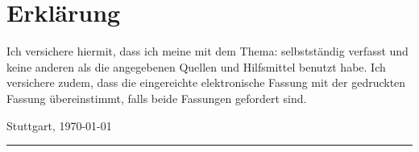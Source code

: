
\thispagestyle{empty}

\section*{Erklärung}
\vspace*{2em}

Ich versichere hiermit, dass ich meine {\art} mit dem Thema: {\itshape \titel } selbstständig verfasst und keine anderen als die angegebenen Quellen und Hilfsmittel benutzt habe. Ich versichere zudem, dass die eingereichte elektronische Fassung mit der gedruckten Fassung übereinstimmt, falls beide Fassungen gefordert sind. 

\vspace{3em}

Stuttgart, \today
\vspace{4em}

\rule{6cm}{0.4pt}\\
\autor